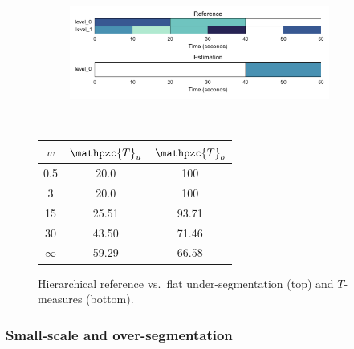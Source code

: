 \documentclass{article}
\def\shag{\ensuremath{\mathpzc{T}}}
\begin{document}
\begin{figure}
  \centering
  \begin{subfigure}{0.5\textwidth}
    \centering
    \includegraphics[width=0.94\textwidth]{figs/hier-flatlarger.pdf}
  \end{subfigure}%
  \\
  \begin{minipage}{0.5\textwidth}
    \centering
    \vspace{10pt}
    \begin{tabular}{|c|c|c|}
      \hline
      $w$       & $\shag_u$    & $\shag_o$      \\
      \hline
      0.5       & 20.0      & 100      \\     
      3         & 20.0      & 100      \\
      15        & 25.51     & 93.71    \\
      30        & 43.50     & 71.46    \\
      $\infty$  & 59.29     & 66.58    \\
      \hline
    \end{tabular}
  \end{minipage}
  \caption{Hierarchical reference vs.\ flat under-segmentation (top) and $T$-measures (bottom).}
  \label{fig:hier-flatlarger}
\end{figure}


\subsubsection{Small-scale and over-segmentation}
\end{document}
